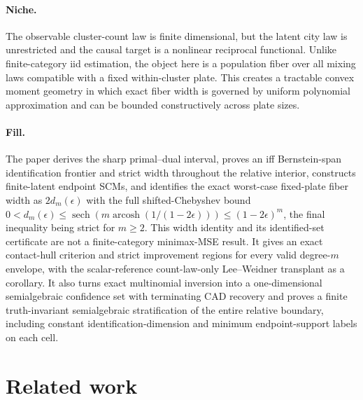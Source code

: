 \documentclass{article}
\begin{document}
\paragraph{Niche.} The observable cluster-count law is finite dimensional, but the latent city law is unrestricted and the causal target is a nonlinear reciprocal functional. Unlike finite-category iid estimation, the object here is a population fiber over all mixing laws compatible with a fixed within-cluster plate. This creates a tractable convex moment geometry in which exact fiber width is governed by uniform polynomial approximation and can be bounded constructively across plate sizes.

\paragraph{Fill.} The paper derives the sharp primal--dual interval, proves an iff Bernstein-span identification frontier and strict width throughout the relative interior, constructs finite-latent endpoint SCMs, and identifies the exact worst-case fixed-plate fiber width as \(2d_m(\epsilon)\) with the full shifted-Chebyshev bound \(0<d_m(\epsilon)\leq\operatorname{sech}(m\operatorname{arcosh}(1/(1-2\epsilon)))\leq(1-2\epsilon)^m\), the final inequality being strict for \(m\geq2\). This width identity and its identified-set certificate are not a finite-category minimax-MSE result. It gives an exact contact-hull criterion and strict improvement regions for every valid degree-\(m\) envelope, with the scalar-reference count-law-only Lee--Weidner transplant as a corollary. It also turns exact multinomial inversion into a one-dimensional semialgebraic confidence set with terminating CAD recovery and proves a finite truth-invariant semialgebraic stratification of the entire relative boundary, including constant identification-dimension and minimum endpoint-support labels on each cell.

\section{Related work}
\end{document}
